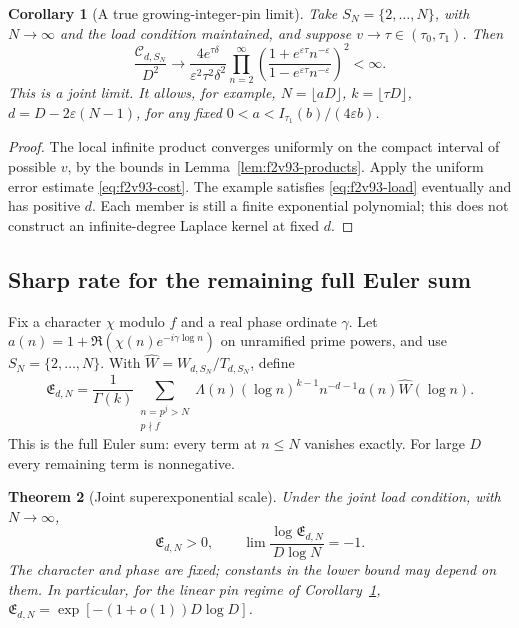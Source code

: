 \documentclass[11pt]{article}
\newtheorem{theorem}{Theorem}[section]
\newtheorem{corollary}[theorem]{Corollary}
\theoremstyle{definition}
\theoremstyle{remark}
\begin{document}
\begin{corollary}[A true growing-integer-pin limit]
\label{cor:f2v93-infinite-product}
Take \(S_N=\{2,\ldots,N\}\), with \(N\to\infty\) and the
load condition maintained, and suppose \(v\to\tau\in(\tau_0,\tau_1)\).
Then
\begin{equation}
 \frac{\mathcal C_{d,S_N}}{D^2}\longrightarrow
 \frac{4e^{\tau\delta}}{\varepsilon^2\tau^2\delta^2}
 \prod_{n=2}^{\infty}
 \left(\frac{1+e^{\varepsilon\tau}n^{-\varepsilon}}
            {1-e^{\varepsilon\tau}n^{-\varepsilon}}\right)^2<\infty.
 \label{eq:f2v93-product-limit}
\end{equation}
This is a joint limit.  It allows, for example,
\(N=\lfloor aD\rfloor\), \(k=\lfloor\tau D\rfloor\),
\(d=D-2\varepsilon(N-1)\), for any fixed
\(0<a<I_{\tau_1}(b)/(4\varepsilon b)\).
\end{corollary}
\begin{proof}
The local infinite product converges uniformly on the compact interval
of possible \(v\), by the bounds in Lemma~\ref{lem:f2v93-products}.
Apply the uniform error estimate \eqref{eq:f2v93-cost}.  The example
satisfies \eqref{eq:f2v93-load} eventually and has positive \(d\).
Each member is still a finite exponential polynomial; this does not
construct an infinite-degree Laplace kernel at fixed \(d\).
\end{proof}

\subsection{Sharp rate for the remaining full Euler sum}

Fix a character \(\chi\) modulo \(f\) and a real phase ordinate
\(\gamma\).  Let \(a(n)=1+\Re(\chi(n)e^{-i\gamma\log n})\)
on unramified prime powers, and use \(S_N=\{2,\ldots,N\}\).
With \(\widehat W=W_{d,S_N}/T_{d,S_N}\), define
\begin{equation}
 \mathfrak E_{d,N}
 =\frac1{\Gamma(k)}\sum_{\substack{n=p^j>N\\p\nmid f}}
     \Lambda(n)(\log n)^{k-1}n^{-d-1}a(n)\widehat W(\log n).
 \label{eq:f2v93-Euler}
\end{equation}
This is the full Euler sum: every term at \(n\le N\) vanishes
exactly.  For large \(D\) every remaining term is nonnegative.

\begin{theorem}[Joint superexponential scale]
\label{thm:f2v93-Euler}
Under the joint load condition, with \(N\to\infty\),
\begin{equation}
 \mathfrak E_{d,N}>0,\qquad
 \lim\frac{\log\mathfrak E_{d,N}}{D\log N}=-1.
 \label{eq:f2v93-Euler-rate}
\end{equation}
The character and phase are fixed; constants in the lower bound may
depend on them.  In particular, for the linear pin regime of
Corollary~\ref{cor:f2v93-infinite-product},
\(\mathfrak E_{d,N}=\exp[-(1+o(1))D\log D]\).
\end{theorem}
\end{document}
